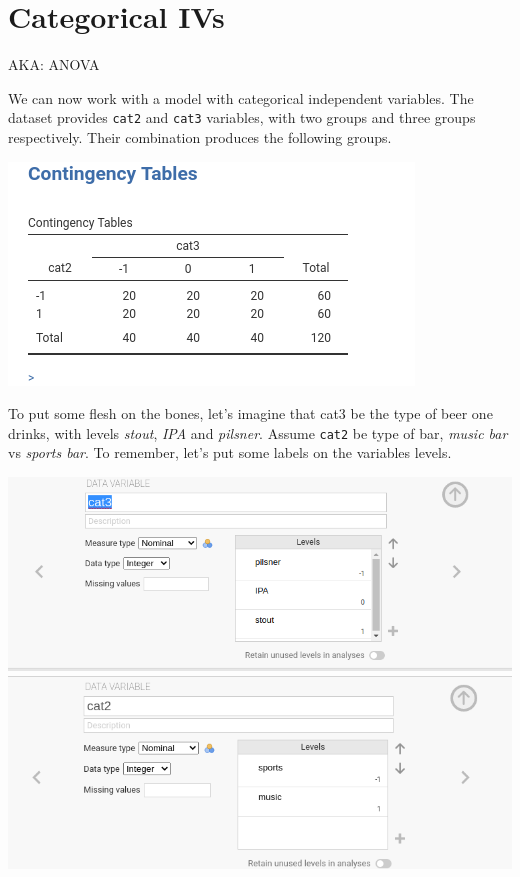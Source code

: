 \documentclass[
]{book}
\begin{document}
\hypertarget{anova}{%
\section{Categorical IVs}\label{anova}}

\begin{flushright} AKA: ANOVA  \end{flushright}

We can now work with a model with categorical independent variables. The dataset provides \texttt{cat2} and \texttt{cat3} variables, with two groups and three groups respectively. Their combination produces the following groups.

\includegraphics[width=0.7\linewidth]{bookletpics/2_anova_output1}

To put some flesh on the bones, let's imagine that cat3 be the type of beer one drinks, with levels \emph{stout}, \emph{IPA} and \emph{pilsner}. Assume \texttt{cat2} be type of bar, \emph{music bar} vs \emph{sports bar}. To remember, let's put some labels on the variables levels.

\includegraphics{bookletpics/2_anova_input1.png}
\includegraphics{bookletpics/2_anova_input2.png}
\end{document}
